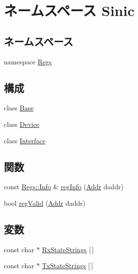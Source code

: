 \hypertarget{namespaceSinic}{
\section{ネームスペース Sinic}
\label{namespaceSinic}
}
\subsection*{ネームスペース}
\begin{DoxyCompactItemize}
\item 
namespace \hyperlink{namespaceSinic_1_1Regs}{Regs}
\end{DoxyCompactItemize}
\subsection*{構成}
\begin{DoxyCompactItemize}
\item 
class \hyperlink{classSinic_1_1Base}{Base}
\item 
class \hyperlink{classSinic_1_1Device}{Device}
\item 
class \hyperlink{classSinic_1_1Interface}{Interface}
\end{DoxyCompactItemize}
\subsection*{関数}
\begin{DoxyCompactItemize}
\item 
const \hyperlink{structSinic_1_1Regs_1_1Info}{Regs::Info} \& \hyperlink{namespaceSinic_aed2d64d4f995743e60f0fee5cca4e739}{regInfo} (\hyperlink{base_2types_8hh_af1bb03d6a4ee096394a6749f0a169232}{Addr} daddr)
\item 
bool \hyperlink{namespaceSinic_af92abee16113e5012fa829e4935d917a}{regValid} (\hyperlink{base_2types_8hh_af1bb03d6a4ee096394a6749f0a169232}{Addr} daddr)
\end{DoxyCompactItemize}
\subsection*{変数}
\begin{DoxyCompactItemize}
\item 
const char $\ast$ \hyperlink{namespaceSinic_aafc3b60f55352a04a630cfd84d9d641a}{RxStateStrings} \mbox{[}$\,$\mbox{]}
\item 
const char $\ast$ \hyperlink{namespaceSinic_af3483fda812098251269cec3e53de3b7}{TxStateStrings} \mbox{[}$\,$\mbox{]}
\end{DoxyCompactItemize}


